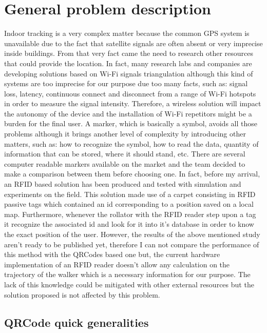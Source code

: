 \chapter{General problem description}

Indoor tracking is a very complex matter because the common GPS system is unavailable due to the fact that satellite signals are often absent or very imprecise inside buildings. From that very fact came the need to research other resources that could provide the location. In fact, many research labs and companies are developing solutions based on Wi-Fi signals triangulation although this kind of systems are too imprecise\cite{wifiimprecise} for our purpose due too many facts, such as: signal loss, latency, continuous connect and disconnect from a range of Wi-Fi hotspots in order to measure the signal intensity.
Therefore, a wireless solution will impact the autonomy of the device and the installation of Wi-Fi repetitors might be a burden for the final user.
A marker, which is basically a symbol, avoids all those problems although it brings another level of complexity by introducing other matters, such as: how to recognize the symbol, how to read the data, quantity of information that can be stored, where it should stand, etc.
There are several computer readable markers available on the market and the team decided to make a comparison between them before choosing one.
In fact, before my arrival, an RFID based solution has been produced and tested with simulation and experiments on the field.
This solution made use of a carpet consisting in RFID passive tags which contained an id corresponding to a position saved on a local map. Furthermore, whenever the rollator with the RFID reader step upon a tag it recognize the associated id and look for it into it's database in order to know the exact position of the user. However, the results of the above mentioned study aren't ready to be published yet, therefore I can not compare the performance of this method with the QRCodes based one but, the current hardware implementation of an RFID reader doesn't allow any calculation on the trajectory of the walker which is a necessary information for our purpose.
The lack of this knowledge could be mitigated with other external resources but the solution proposed is not affected by this problem. 


\section{QRCode quick generalities}

